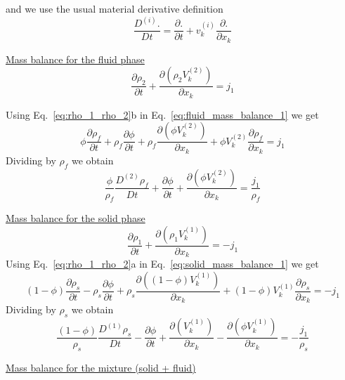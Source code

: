 \documentclass[]{scrreprt}
\begin{document}
and we use the usual material derivative definition
\begin{equation}
  \label{eq:material_derivative}
  \frac{D^{(i)}.}{D t} = \frac{\partial.}{\partial t} + v^{(i)}_k \frac{\partial.}{\partial x_k}
\end{equation}


\underline{Mass balance for the fluid phase}
\begin{equation}
  \label{eq:fluid_mass_balance_1}
  \frac{\partial \rho_2}{\partial t} + \frac{\partial( \rho_2 V^{(2)}_k)}{\partial x_k}= j_1
\end{equation}

Using Eq.~\ref{eq:rho_1_rho_2}b in Eq.~\ref{eq:fluid_mass_balance_1} we get
\begin{equation}
  \label{eq:fluid_mass_balance_2}
  \phi \frac{\partial \rho_f }{\partial t} + \rho_f\frac{\partial \phi }{\partial t} + \rho_f\frac{\partial( \phi V^{(2)}_k)}{\partial x_k}+ \phi V^{(2)}_k\frac{\partial\rho_f}{\partial x_k} = j_1
\end{equation}
Dividing by $\rho_f$ we obtain
\begin{equation}
  \label{eq:fluid_mass_balance}
  \frac{\phi}{\rho_f} \frac{D^{(2)} \rho_f }{D t} + \frac{\partial \phi }{\partial t} + \frac{\partial( \phi V^{(2)}_k)}{\partial x_k} = \frac{j_1}{\rho_f}
\end{equation}


\underline{Mass balance for the solid phase}
\begin{equation}
  \label{eq:solid_mass_balance_1}
  \frac{\partial \rho_1}{\partial t} + \frac{\partial( \rho_1 V^{(1)}_k)}{\partial x_k}= -j_1
\end{equation}
Using Eq.~\ref{eq:rho_1_rho_2}a in Eq.~\ref{eq:solid_mass_balance_1} we get
\begin{equation}
  \label{eq:solid_mass_balance_2}
  (1-\phi) \frac{\partial \rho_s }{\partial t} - \rho_s\frac{\partial \phi }{\partial t} + \rho_s\frac{\partial( (1-\phi) V^{(1)}_k)}{\partial x_k}+ (1-\phi) V^{(1)}_k\frac{\partial\rho_s}{\partial x_k} = -j_1
\end{equation}
Dividing by $\rho_s$ we obtain
\begin{equation}
  \label{eq:solid_mass_balance}
  \frac{(1-\phi)}{\rho_s} \frac{D^{(1)} \rho_s }{D t} - \frac{\partial \phi }{\partial t} + \frac{\partial(V^{(1)}_k)}{\partial x_k} - \frac{\partial( \phi V^{(1)}_k)}{\partial x_k} = -\frac{j_1}{\rho_s}
\end{equation}

\underline{Mass balance for the mixture (solid + fluid)}
\end{document}
